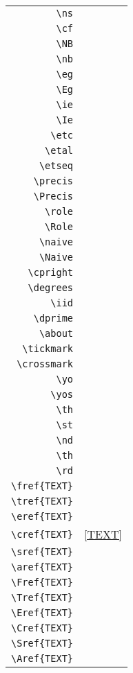 \begin{center}
	\begin{longtable}{>{\ttfamily} r | >{\small}l}
		\verb|\ns|			& \ns \\
		\verb|\cf|			& \cf \\
		\verb|\NB|			& \NB \\
		\verb|\nb|			& \nb \\		
		\verb|\eg|			& \eg \\
		\verb|\Eg|			& \Eg \\
		\verb|\ie|			& \ie \\
		\verb|\Ie|			& \Ie \\	
		\verb|\etc|			& \etc \\
		\verb|\etal|		& \etal \\
		\verb|\etseq|		& \etseq \\
		\verb|\precis|		& \precis \\		
		\verb|\Precis|		& \Precis \\
		\verb|\role|		& \role \\
		\verb|\Role|		& \Role \\
		\verb|\naive|		& \naive \\		
		\verb|\Naive|		& \Naive \\
		\verb|\cpright|		& \cpright \\
		\verb|\degrees|		& \degrees \\
		\verb|\iid|			& \iid \\	
		\verb|\dprime|		& \dprime \\
		\verb|\about|		& \about \\
		\verb|\tickmark|	& \tickmark \\
		\verb|\crossmark|	& \crossmark \\
		\verb|\yo|			& \yo \\
		\verb|\yos|			& \yos \\		
		\verb|\th|			& \th \\
		\verb|\st|			& \st \\
		\verb|\nd|			& \nd \\
		\verb|\th|			& \th \\		
		\verb|\rd|			& \rd \\
		\verb|\fref{TEXT}|		& \fref{TEXT} \\
		\verb|\tref{TEXT}|		& \tref{TEXT} \\
		\verb|\eref{TEXT}|		& \eref{TEXT} \\
		\verb|\cref{TEXT}|		& \cref{TEXT} \\		
		\verb|\sref{TEXT}|		& \sref{TEXT} \\
		\verb|\aref{TEXT}|		& \aref{TEXT} \\
		\verb|\Fref{TEXT}|		& \Fref{TEXT} \\
		\verb|\Tref{TEXT}|		& \Tref{TEXT} \\
		\verb|\Eref{TEXT}|		& \Eref{TEXT} \\
		\verb|\Cref{TEXT}|		& \Cref{TEXT} \\		
		\verb|\Sref{TEXT}|		& \Sref{TEXT} \\
		\verb|\Aref{TEXT}|		& \Aref{TEXT} \\									
	\end{longtable}
\end{center}


